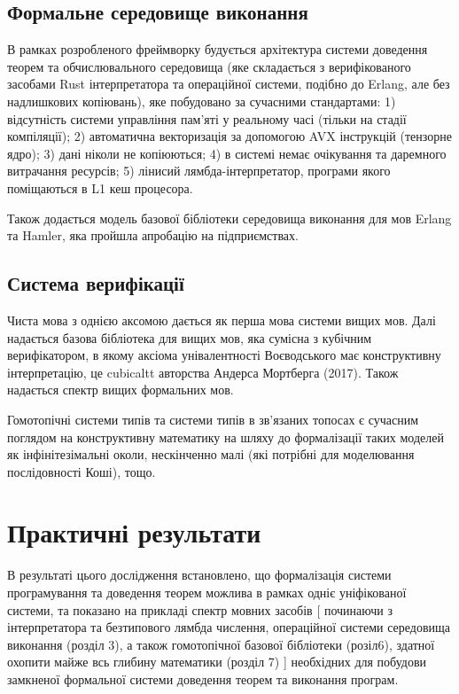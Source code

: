 \subsection{Формальне середовище виконання}
В рамках розробленого фреймворку будується
архітектура системи доведення теорем та обчислювального
середовища (яке складається з верифікованого засобами Rust
інтерпретатора та операційної системи, подібно до Erlang, але без надлишкових копіювань),
яке побудовано за сучасними стандартами:
1) відсутність системи управління пам'яті у реальному часі (тільки на стадії компіляції);
2) автоматична векторизація за допомогою AVX інструкцій (тензорне ядро);
3) дані ніколи не копіюються;
4) в системі немає очікування та даремного витрачання ресурсів;
5) лінисий лямбда-інтерпретатор, програми якого поміщаються в L1 кеш процесора.

Також додається модель базової бібліотеки середовища виконання для мов Erlang та Hamler,
яка пройшла апробацію на підприємствах.

\subsection{Система верифікації}
Чиста мова з однією аксомою дається як перша мова системи вищих мов.
Далі надається базова бібліотека для вищих мов, яка сумісна з кубічним верифікатором,
в якому аксіома унівалентності Воєводського має конструктивну інтерпретацію,
це cubicaltt авторства Андерса Мортберга (2017). Також надається спектр вищих формальних мов.

Гомотопічні системи типів та системи типів в зв'язаних топосах є сучасним поглядом на
конструктивну математику на шляху до формалізації таких моделей як інфінітезімальні околи,
нескінченно малі (які потрібні для моделювання послідовності Коші), тощо.

\section{Практичні результати}
В результаті цього дослідження встановлено, що формалізація системи
програмування та доведення теорем можлива в рамках одніє уніфікованої
системи, та показано на прикладі спектр мовних засобів [ починаючи з інтерпретатора
та безтипового лямбда числення, операційної системи середовища виконання (розділ 3),
а також гомотопічної базової бібліотеки (розіл6), здатної охопити майже всь
глибину математики (розділ 7) ] необхідних для побудови замкненої формальної системи
доведення теорем та виконання програм.

